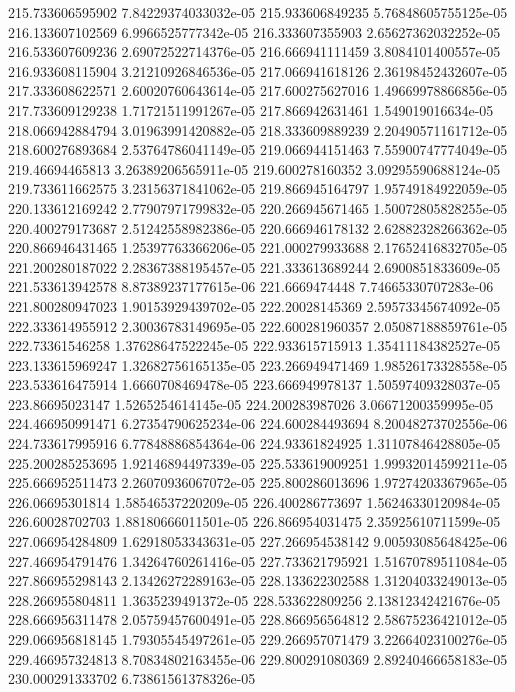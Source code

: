 {215.733606595902 7.84229374033032e-05
215.933606849235 5.76848605755125e-05
216.133607102569 6.9966525777342e-05
216.333607355903 2.65627362032252e-05
216.533607609236 2.69072522714376e-05
216.666941111459 3.8084101400557e-05
216.933608115904 3.21210926846536e-05
217.066941618126 2.36198452432607e-05
217.333608622571 2.60020760643614e-05
217.600275627016 1.49669978866856e-05
217.733609129238 1.71721511991267e-05
217.866942631461 1.549019016634e-05
218.066942884794 3.01963991420882e-05
218.333609889239 2.20490571161712e-05
218.600276893684 2.53764786041149e-05
219.066944151463 7.55900747774049e-05
219.46694465813 3.26389206565911e-05
219.600278160352 3.09295590688124e-05
219.733611662575 3.23156371841062e-05
219.866945164797 1.95749184922059e-05
220.133612169242 2.77907971799832e-05
220.266945671465 1.50072805828255e-05
220.400279173687 2.51242558982386e-05
220.666946178132 2.62882328266362e-05
220.866946431465 1.25397763366206e-05
221.000279933688 2.17652416832705e-05
221.200280187022 2.28367388195457e-05
221.333613689244 2.6900851833609e-05
221.533613942578 8.87389237177615e-06
221.6669474448 7.74665330707283e-06
221.800280947023 1.90153929439702e-05
222.20028145369 2.59573345674092e-05
222.333614955912 2.30036783149695e-05
222.600281960357 2.05087188859761e-05
222.73361546258 1.37628647522245e-05
222.933615715913 1.35411184382527e-05
223.133615969247 1.32682756165135e-05
223.266949471469 1.98526173328558e-05
223.533616475914 1.6660708469478e-05
223.666949978137 1.50597409328037e-05
223.86695023147 1.5265254614145e-05
224.200283987026 3.06671200359995e-05
224.466950991471 6.27354790625234e-06
224.600284493694 8.20048273702556e-06
224.733617995916 6.77848886854364e-06
224.93361824925 1.31107846428805e-05
225.200285253695 1.92146894497339e-05
225.533619009251 1.99932014599211e-05
225.666952511473 2.26070936067072e-05
225.800286013696 1.97274203367965e-05
226.06695301814 1.58546537220209e-05
226.400286773697 1.56246330120984e-05
226.60028702703 1.88180666011501e-05
226.866954031475 2.35925610711599e-05
227.066954284809 1.62918053343631e-05
227.266954538142 9.00593085648425e-06
227.466954791476 1.34264760261416e-05
227.733621795921 1.51670789511084e-05
227.866955298143 2.13426272289163e-05
228.133622302588 1.31204033249013e-05
228.266955804811 1.3635239491372e-05
228.533622809256 2.13812342421676e-05
228.666956311478 2.05759457600491e-05
228.866956564812 2.58675236421012e-05
229.066956818145 1.79305545497261e-05
229.266957071479 3.22664023100276e-05
229.466957324813 8.70834802163455e-06
229.800291080369 2.89240466658183e-05
230.000291333702 6.73861561378326e-05
}
